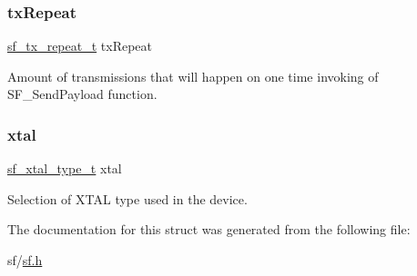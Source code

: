 \subsubsection{\texorpdfstring{txRepeat}{txRepeat}}
{\footnotesize\ttfamily \mbox{\hyperlink{group__sf__enum__group_ga7d2f06984784542a95d02e422a42d9cf}{sf\+\_\+tx\+\_\+repeat\+\_\+t}} tx\+Repeat}

Amount of transmissions that will happen on one time invoking of S\+F\+\_\+\+Send\+Payload function. \mbox{\label{structsf__user__config__t_a39dc4132c306ddfd5c953d25ec462e82}} 
\subsubsection{\texorpdfstring{xtal}{xtal}}
{\footnotesize\ttfamily \mbox{\hyperlink{group__sf__enum__group_ga921cd8c6964917cde98f2a132c5548d5}{sf\+\_\+xtal\+\_\+type\+\_\+t}} xtal}

Selection of X\+T\+AL type used in the device. 

The documentation for this struct was generated from the following file\+:\begin{DoxyCompactItemize}
\item 
sf/\mbox{\hyperlink{sf_8h}{sf.\+h}}\end{DoxyCompactItemize}

